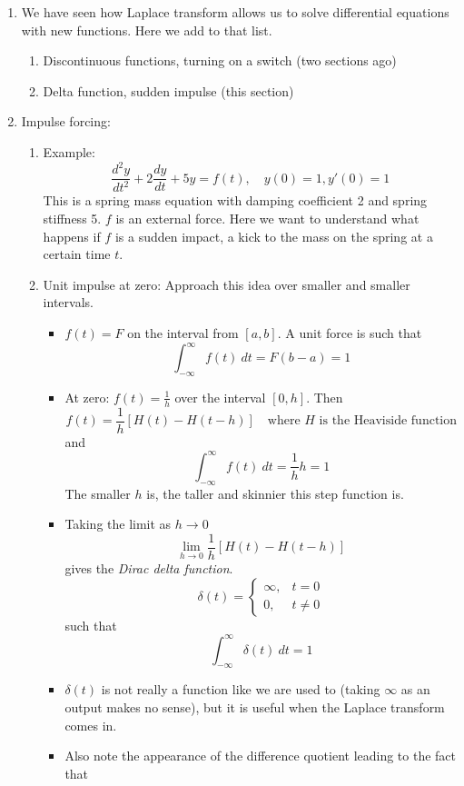 \documentclass{article}
\begin{document}
\begin{enumerate}

\item We have seen how Laplace transform allows us to solve differential equations with new functions. Here we add to that list.
\begin{enumerate}
\item Discontinuous functions, turning on a switch (two sections ago)
\item Delta function, sudden impulse (this section)
\end{enumerate}

\item Impulse forcing: 
\begin{enumerate}
\item Example: 
\[
\frac{d^2y}{dt^2}+2\frac{dy}{dt}+5y = f(t),\quad y(0)=1, y'(0)=1
\]
This is a spring mass equation with damping coefficient 2 and spring stiffness 5. $f$ is an external force. Here we want to understand what happens if $f$ is a sudden impact, a kick to the mass on the spring at a certain time $t$.
\item Unit impulse at zero: Approach this idea over smaller and smaller intervals.
\begin{itemize}
\item $f(t)=F$ on the interval from $[a,b]$. A unit force is such that 
\[
\int_{-\infty}^{\infty} f(t)~dt = F(b-a) = 1
\]
\item At zero: $f(t)=\frac{1}{h}$ over the interval $[0,h]$. Then 
\[
f(t) = \frac{1}{h}\left[H(t)-H(t-h)\right] \quad \text{where $H$ is the Heaviside function}
\]
and
\[
\int_{-\infty}^{\infty} f(t)~dt = \frac{1}{h} h = 1
\]
The smaller $h$ is, the taller and skinnier this step function is. 
\item Taking the limit as $h \rightarrow 0$
\[
\lim_{h\rightarrow 0} \frac{1}{h}\left[H(t)-H(t-h)\right]
\]
gives the \emph{Dirac delta function}.
\[
\delta (t) = \begin{cases}
\infty, &t=0 \\
0, &t \neq 0
\end{cases}
\]
such that 
\[
\int_{-\infty}^{\infty} \delta(t)~dt = 1
\]
\item $\delta(t)$ is not really a function like we are used to (taking $\infty$ as an output makes no sense), but it is useful when the Laplace transform comes in.
\item Also note the appearance of the difference quotient leading to the fact that 

\end{itemize}
\end{enumerate}
\end{enumerate}
\end{document}
